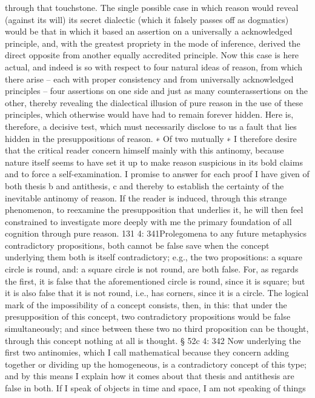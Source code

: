 through that touchstone.
The single possible case in which reason would reveal (against its
will) its secret dialectic (which it falsely passes off as dogmatics) would
be that in which it based an assertion on a universally a acknowledged
principle, and, with the greatest propriety in the mode of inference,
derived the direct opposite from another equally accredited principle.
Now this case is here actual, and indeed is so with respect to four natural
ideas of reason, from which there arise – each with proper consistency
and from universally acknowledged principles – four assertions on one
side and just as many counterassertions on the other, thereby revealing
the dialectical illusion of pure reason in the use of these principles, which
otherwise would have had to remain forever hidden.
Here is, therefore, a decisive test, which must necessarily disclose to us
a fault that lies hidden in the presuppositions of reason. ∗ Of two mutually
∗
I therefore desire that the critical reader concern himself mainly with this
antinomy, because nature itself seems to have set it up to make reason suspicious
in its bold claims and to force a self-examination. I promise to answer for each
proof I have given of both thesis b and antithesis, c and thereby to establish the
certainty of the inevitable antinomy of reason. If the reader is induced, through
this strange phenomenon, to reexamine the presupposition that underlies it,
he will then feel constrained to investigate more deeply with me the primary
foundation of all cognition through pure reason.
131
4: 341Prolegomena to any future metaphysics
contradictory propositions, both cannot be false save when the concept
underlying them both is itself contradictory; e.g., the two propositions:
a square circle is round, and: a square circle is not round, are both false.
For, as regards the ﬁrst, it is false that the aforementioned circle is round,
since it is square; but it is also false that it is not round, i.e., has corners,
since it is a circle. The logical mark of the impossibility of a concept
consists, then, in this: that under the presupposition of this concept,
two contradictory propositions would be false simultaneously; and since
between these two no third proposition can be thought, through this
concept nothing at all is thought.
§ 52c
4: 342
Now underlying the ﬁrst two antinomies, which I call mathematical
because they concern adding together or dividing up the homogeneous,
is a contradictory concept of this type; and by this means I explain how
it comes about that thesis and antithesis are false in both.
If I speak of objects in time and space, I am not speaking of things

